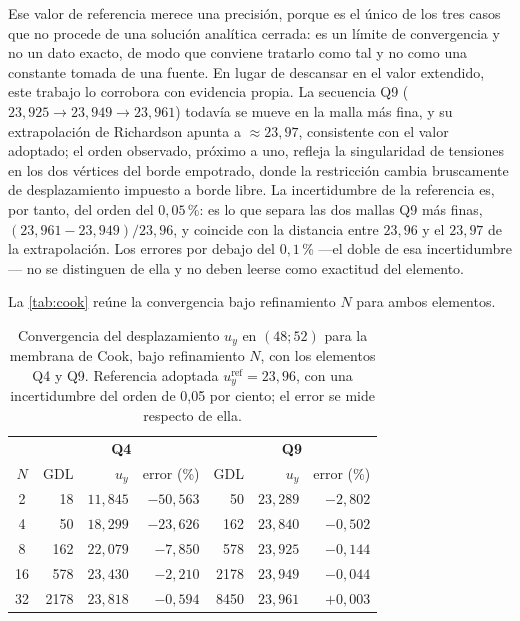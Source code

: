 Ese valor de referencia merece una precisión, porque es el único de los tres casos que no procede de una solución analítica cerrada: es un límite de convergencia y no un dato exacto, de modo que conviene tratarlo como tal y no como una constante tomada de una fuente. En lugar de descansar en el valor extendido, este trabajo lo corrobora con evidencia propia. La secuencia Q9 ($23{,}925 \to 23{,}949 \to 23{,}961$) todavía se mueve en la malla más fina, y su extrapolación de Richardson \autocite[pp.~309-312]{oberkampf2010vv} apunta a $\approx 23{,}97$, consistente con el valor adoptado; el orden observado, próximo a uno, refleja la singularidad de tensiones en los dos vértices del borde empotrado, donde la restricción cambia bruscamente de desplazamiento impuesto a borde libre. La incertidumbre de la referencia es, por tanto, del orden del $0{,}05\,\%$: es lo que separa las dos mallas Q9 más finas, $(23{,}961-23{,}949)/23{,}96$, y coincide con la distancia entre $23{,}96$ y el $23{,}97$ de la extrapolación. Los errores por debajo del $0{,}1\,\%$ ---el doble de esa incertidumbre--- no se distinguen de ella y no deben leerse como exactitud del elemento.

La \autoref{tab:cook} reúne la convergencia bajo refinamiento $N$ para ambos elementos.

\begin{table}[htbp]
\centering
\caption[Convergencia del desplazamiento $u_y$ en $(48;52)$ para la membrana de Cook.]{Convergencia del desplazamiento $u_y$ en $(48;52)$ para la membrana de Cook, bajo refinamiento $N$, con los elementos Q4 y Q9. Referencia adoptada $u_y^{\text{ref}} = 23{,}96$, con una incertidumbre del orden de 0,05 por ciento; el error se mide respecto de ella.}
\label{tab:cook}
\begin{tabular}{c r r r r r r}
\hline
 & \multicolumn{3}{c}{\textbf{Q4}} & \multicolumn{3}{c}{\textbf{Q9}} \\
$N$ & GDL & $u_y$ & error (\%) & GDL & $u_y$ & error (\%) \\
\hline
2  & 18   & $11{,}845$ & $-50{,}563$ & 50   & $23{,}289$ & $-2{,}802$ \\
4  & 50   & $18{,}299$ & $-23{,}626$ & 162  & $23{,}840$ & $-0{,}502$ \\
8  & 162  & $22{,}079$ & $-7{,}850$  & 578  & $23{,}925$ & $-0{,}144$ \\
16 & 578  & $23{,}430$ & $-2{,}210$  & 2178 & $23{,}949$ & $-0{,}044$ \\
32 & 2178 & $23{,}818$ & $-0{,}594$  & 8450 & $23{,}961$ & $+0{,}003$ \\
\hline
\end{tabular}
\end{table}

